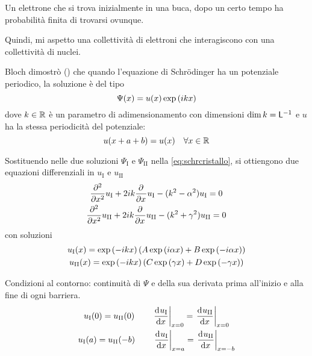 Un elettrone che si trova inizialmente in una buca, dopo un certo tempo ha probabilità finita di trovarsi ovunque.

Quindi, mi aspetto una collettività di elettroni che interagiscono con una collettività di nuclei.

Bloch dimostrò () che quando l'equazione di Schrödinger ha un potenziale periodico, la soluzione è del tipo
\begin{equation}
\label{eq:bloch}
    \Psi(x) = u(x) \operatorname{exp}\left( i k x \right)
\end{equation}
dove $k \in \mathbb{R}$ è un parametro di adimensionamento con dimensioni $\operatorname{dim}{k} = \mathsf{L}^{-1}$ e $u$ ha la stessa periodicità del potenziale:
\begin{equation}
    u(x + a + b) = u(x) \quad \forall x \in \mathbb{R}
\end{equation}

Sostituendo nelle due soluzioni $\Psi_\mathrm{I}$ e $\Psi_\mathrm{II}$ nella \eqref{eq:schrcristallo}, si ottiengono due equazioni differenziali in $u_\mathrm{I}$ e $u_\mathrm{II}$
\begin{subequations}
    \begin{gather}
        \parder[][2]{x} u_\mathrm{I} + 2\im k \parder{x} u_\mathrm{I} - (k^2 - \alpha^2) u_\mathrm{I} = 0 \\
        \parder[][2]{x} u_\mathrm{II} + 2\im k \parder{x} u_\mathrm{II} - (k^2 + \gamma^2) u_\mathrm{II} = 0
    \end{gather}
\end{subequations}
con soluzioni
\begin{subequations}
    \begin{gather}
        u_\mathrm{I}(x) = \operatorname{exp}\left( -i k x \right) \left( A \operatorname{exp}\left( i \alpha x \right) + B \operatorname{exp}\left( -i \alpha x \right) \right) \\
        u_\mathrm{II}(x) = \operatorname{exp}\left( -i k x \right) \left( C \operatorname{exp}\left( \gamma x \right) + D \operatorname{exp}\left( -\gamma x \right) \right)
    \end{gather}
\end{subequations}

Condizioni al contorno: continuità di $\Psi$ e della sua derivata prima all'inizio e alla fine di ogni barriera.
\begin{subequations}
    \begin{gather}
        u_\mathrm{I}(0) = u_\mathrm{II}(0) \qquad
        \evalat{\der[u_\mathrm{I}]{x}}{x = 0} = \evalat{\der[u_\mathrm{II}]{x}}{x = 0} \\
    \label{eq:boundaryuii}
        u_\mathrm{I}(a) = u_\mathrm{II}(-b) \qquad
        \evalat{\der[u_\mathrm{I}]{x}}{x = a} = \evalat{\der[u_\mathrm{II}]{x}}{x = -b}
    \end{gather}
\end{subequations}

